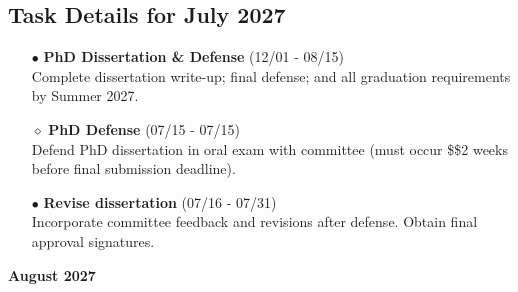 \documentclass[landscape,a4paper]{article}
\begin{document}
\subsection{Task Details for July 2027}
\begin{itemize}[leftmargin=1cm]
    \item[\textcolor{other}{$\bullet$}] \textbf{PhD Dissertation \& Defense} (12/01 - 08/15)\\ Complete dissertation write-up; final defense; and all graduation requirements by Summer 2027.
    \item[\textcolor{other}{$\diamond$}] \textbf{PhD Defense} (07/15 - 07/15)\\ Defend PhD dissertation in oral exam with committee (must occur \$\geq\$2 weeks before final submission deadline).
    \item[\textcolor{other}{$\bullet$}] \textbf{Revise dissertation} (07/16 - 07/31)\\ Incorporate committee feedback and revisions after defense. Obtain final approval signatures.
\end{itemize}

\newpage
\pagestyle{empty}

\begin{center}
{\large\textbf{August 2027}}
\end{center}

\vspace{0.5cm}
\end{document}
